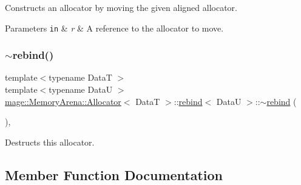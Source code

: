 Constructs an allocator by moving the given aligned allocator.


\begin{DoxyParams}[1]{Parameters}
\mbox{\tt in}  & {\em r} & A reference to the allocator to move. \\
\hline
\end{DoxyParams}
\hypertarget{structmage_1_1_memory_arena_1_1_allocator_1_1rebind_aa16db3ef40f7564d9079ee615239bda5}{}\label{structmage_1_1_memory_arena_1_1_allocator_1_1rebind_aa16db3ef40f7564d9079ee615239bda5} 
\subsubsection{\texorpdfstring{$\sim$rebind()}{~rebind()}}
{\footnotesize\ttfamily template$<$typename DataT $>$ \\
template$<$typename DataU $>$ \\
\hyperlink{structmage_1_1_memory_arena_1_1_allocator}{mage\+::\+Memory\+Arena\+::\+Allocator}$<$ DataT $>$\+::\hyperlink{structmage_1_1_memory_arena_1_1_allocator_1_1rebind}{rebind}$<$ DataU $>$\+::$\sim$\hyperlink{structmage_1_1_memory_arena_1_1_allocator_1_1rebind}{rebind} (\begin{DoxyParamCaption}{ }\end{DoxyParamCaption})\hspace{0.3cm}{\ttfamily [private]}, {\ttfamily [delete]}}

Destructs this allocator. 

\subsection{Member Function Documentation}
\hypertarget{structmage_1_1_memory_arena_1_1_allocator_1_1rebind_a2d7fe95797686c132cc76cf89d9bb259}{}\label{structmage_1_1_memory_arena_1_1_allocator_1_1rebind_a2d7fe95797686c132cc76cf89d9bb259} 
